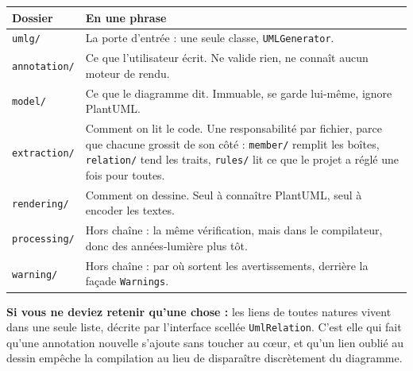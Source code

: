 \documentclass[12pt, a4paper]{article}
\begin{document}
\begin{center}
\begin{tabular}{L{3.2cm} L{10.5cm}}
\toprule
\textbf{Dossier} & \textbf{En une phrase} \\
\midrule
\texttt{umlg/} & La porte d'entrée : une seule classe, \texttt{UMLGenerator}. \\
\addlinespace
\texttt{annotation/} & Ce que l'utilisateur écrit. Ne valide rien, ne connaît aucun moteur de rendu. \\
\addlinespace
\texttt{model/} & Ce que le diagramme dit. Immuable, se garde lui-même, ignore PlantUML. \\
\addlinespace
\texttt{extraction/} & Comment on lit le code. Une responsabilité par fichier, parce que chacune grossit de son côté : \texttt{member/} remplit les boîtes, \texttt{relation/} tend les traits, \texttt{rules/} lit ce que le projet a réglé une fois pour toutes. \\
\addlinespace
\texttt{rendering/} & Comment on dessine. Seul à connaître PlantUML, seul à encoder les textes. \\
\addlinespace
\texttt{processing/} & Hors chaîne : la même vérification, mais dans le compilateur, donc des années-lumière plus tôt. \\
\addlinespace
\texttt{warning/} & Hors chaîne : par où sortent les avertissements, derrière la façade \texttt{Warnings}. \\
\bottomrule
\end{tabular}
\end{center}

\vspace{1em}

\noindent
\textbf{Si vous ne deviez retenir qu'une chose :} les liens de toutes natures vivent dans une
seule liste, décrite par l'interface scellée \texttt{UmlRelation}. C'est elle qui fait qu'une
annotation nouvelle s'ajoute sans toucher au c\oe ur, et qu'un lien oublié au dessin empêche la
compilation au lieu de disparaître discrètement du diagramme.
\end{document}
